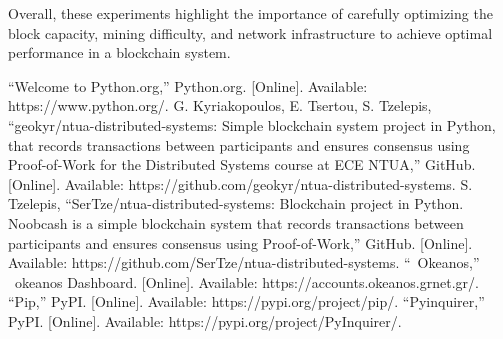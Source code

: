 \documentclass[conference]{IEEEtran}
\begin{document}
Overall, these experiments highlight the importance of carefully optimizing the block capacity, mining difficulty, and network infrastructure to achieve optimal performance in a blockchain system.

\begin{thebibliography}{00}
 “Welcome to Python.org,” Python.org. [Online]. Available: https://www.python.org/.
 G. Kyriakopoulos, E. Tsertou, S. Tzelepis, “geokyr/ntua-distributed-systems: Simple blockchain system project in Python, that records transactions between participants and ensures consensus using Proof-of-Work for the Distributed Systems course at ECE NTUA,” GitHub. [Online]. Available: https://github.com/geokyr/ntua-distributed-systems.
 S. Tzelepis, “SerTze/ntua-distributed-systems: Blockchain project in Python. Noobcash is a simple blockchain system that records transactions between participants and ensures consensus using Proof-of-Work,” GitHub. [Online]. Available: https://github.com/SerTze/ntua-distributed-systems.
 “~Okeanos,” ~okeanos Dashboard. [Online]. Available: https://accounts.okeanos.grnet.gr/.
 “Pip,” PyPI. [Online]. Available: https://pypi.org/project/pip/.
 “Pyinquirer,” PyPI. [Online]. Available: https://pypi.org/project/PyInquirer/.
\end{thebibliography}
\end{document}
